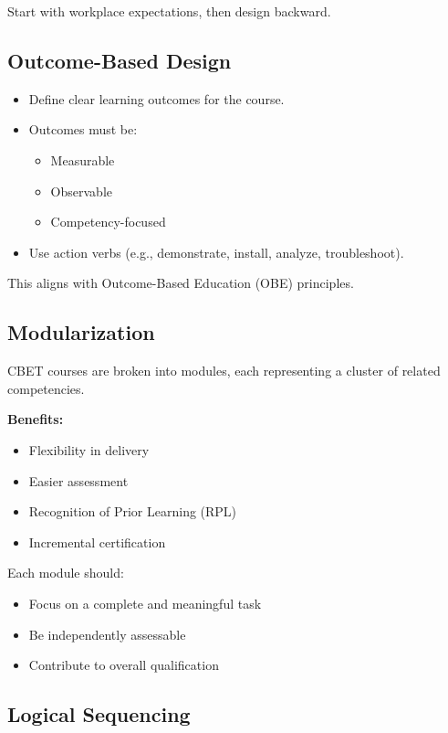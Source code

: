 \documentclass[12pt]{article}
\begin{document}
Start with workplace expectations, then design backward.

\subsection{Outcome-Based Design}

\begin{itemize}
    \item Define clear learning outcomes for the course.
    \item Outcomes must be:
    \begin{itemize}
        \item Measurable
        \item Observable
        \item Competency-focused
    \end{itemize}
    \item Use action verbs (e.g., demonstrate, install, analyze, troubleshoot).
\end{itemize}

This aligns with Outcome-Based Education (OBE) principles.

\subsection{Modularization}

CBET courses are broken into modules, each representing a cluster of related competencies.

\textbf{Benefits:}

\begin{itemize}
    \item Flexibility in delivery
    \item Easier assessment
    \item Recognition of Prior Learning (RPL)
    \item Incremental certification
\end{itemize}

Each module should:

\begin{itemize}
    \item Focus on a complete and meaningful task
    \item Be independently assessable
    \item Contribute to overall qualification
\end{itemize}

\subsection{Logical Sequencing}
\end{document}
